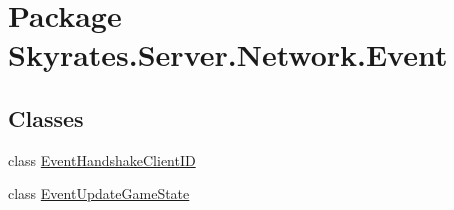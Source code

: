 \hypertarget{namespace_skyrates_1_1_server_1_1_network_1_1_event}{\section{Package Skyrates.\-Server.\-Network.\-Event}
\label{namespace_skyrates_1_1_server_1_1_network_1_1_event}
}
\subsection*{Classes}
\begin{DoxyCompactItemize}
\item 
class \hyperlink{class_skyrates_1_1_server_1_1_network_1_1_event_1_1_event_handshake_client_i_d}{Event\-Handshake\-Client\-I\-D}
\item 
class \hyperlink{class_skyrates_1_1_server_1_1_network_1_1_event_1_1_event_update_game_state}{Event\-Update\-Game\-State}
\end{DoxyCompactItemize}
